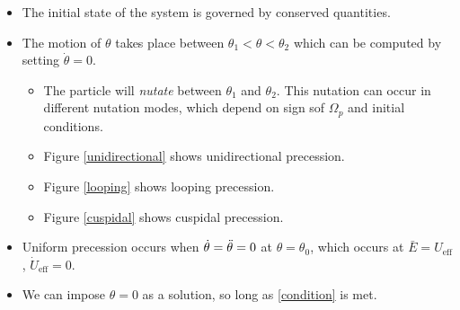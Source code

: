 \documentclass{book}
\begin{document}
\begin{itemize}
	\item The initial state of the system is governed by conserved quantities.
	\item The motion of $\theta$ takes place between $\theta_1 < \theta < \theta_2$ which can be computed by setting $\Dot{\theta} = 0$.
	\begin{itemize}
		\item The particle will \textit{nutate} between $\theta_1$ and $\theta_2$. This nutation can occur in different nutation modes, which depend on sign sof $\Omega_p$ and initial conditions.
		\item Figure \ref{unidirectional} shows unidirectional precession.
		\item Figure \ref{looping} shows looping precession.
		\item Figure \ref{cuspidal} shows cuspidal precession.
	\end{itemize}
	\item Uniform precession occurs when $\Dot{\theta} = \Ddot{\theta} = 0$ at $\theta = \theta_0$, which occurs at $\bar{E} = U_{\text{eff}}$, $\Dot{U}_{\text{eff}} = 0$.
	\item We can impose $\theta = 0$ as a solution, so long as \eqref{condition} is met.
\end{itemize}
\end{document}
